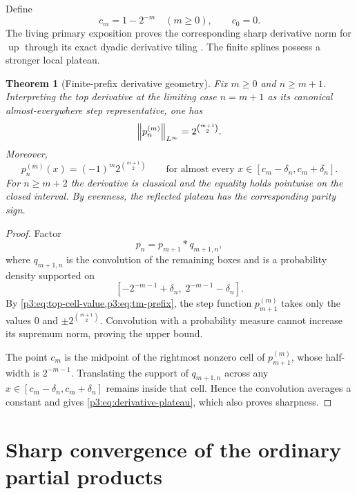 \documentclass[11pt,oneside]{article}
\numberwithin{equation}{section}
\newtheorem{theorem}{Theorem}[section]
\theoremstyle{definition}
\theoremstyle{remark}
\newcommand{\Up}{\operatorname{up}}
\begin{document}
Define
\begin{equation}
 c_m=1-2^{-m}\quad(m\ge0),
 \qquad c_0=0.
 \label{p3:eq:cm}
\end{equation}
The living primary exposition proves the corresponding sharp derivative norm for
$\Up$ through its exact dyadic derivative tiling \cite{p3:proveit-primary}.  The finite
splines possess a stronger local plateau.

\begin{theorem}[Finite-prefix derivative geometry]
\label{p3:thm:derivative-plateau}
Fix $m\ge0$ and $n\ge m+1$.  Interpreting the top derivative at the limiting case
$n=m+1$ as its canonical almost-everywhere step representative, one has
\begin{equation}
 \left\lVert p_n^{(m)}\right\rVert_{L^\infty}=2^{\binom{m+1}{2}}.
 \label{p3:eq:pn-derivative-norm}
\end{equation}
Moreover,
\begin{equation}
 p_n^{(m)}(x)=(-1)^m2^{\binom{m+1}{2}}
 \qquad
 \text{for almost every }x\in[c_m-\delta_n,c_m+\delta_n].
 \label{p3:eq:derivative-plateau}
\end{equation}
For $n\ge m+2$ the derivative is classical and the equality holds pointwise on the
closed interval.  By evenness, the reflected plateau has the corresponding parity sign.
\end{theorem}

\begin{proof}
Factor
\[
 p_n=p_{m+1}*q_{m+1,n},
\]
where $q_{m+1,n}$ is the convolution of the remaining boxes and is a probability
density supported on
\[
 \left[-2^{-m-1}+\delta_n,\;2^{-m-1}-\delta_n\right].
\]
By \cref{p3:eq:top-cell-value,p3:eq:tm-prefix}, the step function
$p_{m+1}^{(m)}$ takes only the values
$0$ and $\pm2^{\binom{m+1}{2}}$.  Convolution with a probability measure cannot
increase its supremum norm, proving the upper bound.

The point $c_m$ is the midpoint of the rightmost nonzero cell of
$p_{m+1}^{(m)}$, whose half-width is $2^{-m-1}$.  Translating the support of
$q_{m+1,n}$ across any $x\in[c_m-\delta_n,c_m+\delta_n]$ remains inside that cell.
Hence the convolution averages a constant and gives \cref{p3:eq:derivative-plateau},
which also proves sharpness.
\end{proof}

\section{Sharp convergence of the ordinary partial products}
\label{p3:sec:sharp-convergence}
\end{document}
